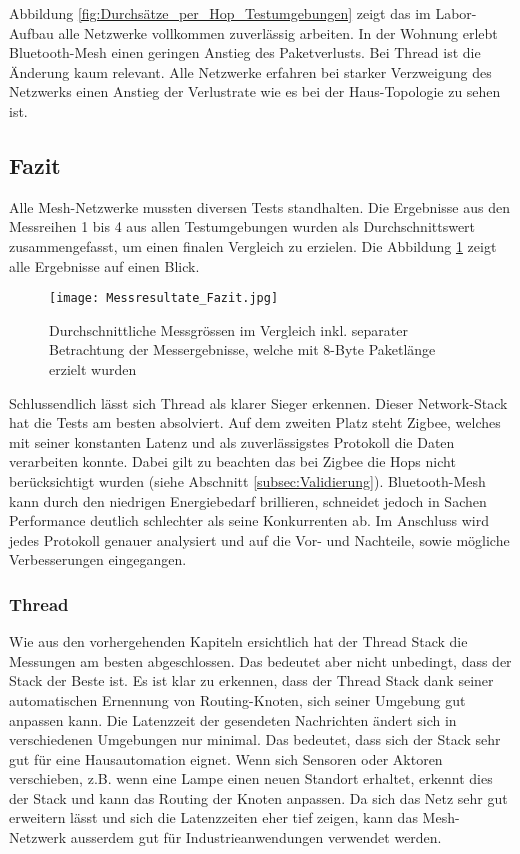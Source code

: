 Abbildung \ref{fig:Durchsätze_per_Hop_Testumgebungen} zeigt das im Labor-Aufbau alle Netzwerke vollkommen zuverlässig arbeiten. In der Wohnung erlebt Bluetooth-Mesh einen geringen Anstieg des Paketverlusts. Bei Thread ist die Änderung kaum relevant. Alle Netzwerke erfahren bei starker Verzweigung des Netzwerks einen Anstieg der Verlustrate wie es bei der Haus-Topologie zu sehen ist. 


\subsection{Fazit}\label{subsec:FazitVergleich}
Alle Mesh-Netzwerke mussten diversen Tests standhalten. Die Ergebnisse aus den Messreihen 1 bis 4 aus allen Testumgebungen wurden als Durchschnittswert zusammengefasst, um einen finalen Vergleich zu erzielen. Die Abbildung \ref{fig:Messresultate_Fazit} zeigt alle Ergebnisse auf einen Blick.

\begin{figure}[H]
	\centering
	\texttt{[image: Messresultate\_Fazit.jpg]}
	\caption{Durchschnittliche Messgrössen im Vergleich inkl. separater Betrachtung der Messergebnisse, welche mit 8-Byte Paketlänge erzielt wurden}\label{fig:Messresultate_Fazit}
\end{figure}

Schlussendlich lässt sich Thread als klarer Sieger erkennen. Dieser Network-Stack hat die Tests am besten absolviert. Auf dem zweiten Platz steht Zigbee, welches mit seiner konstanten Latenz und als zuverlässigstes Protokoll die Daten verarbeiten konnte. Dabei gilt zu beachten das bei Zigbee die Hops nicht berücksichtigt wurden (siehe Abschnitt \ref{subsec:Validierung}). Bluetooth-Mesh kann durch den niedrigen Energiebedarf brillieren, schneidet jedoch in Sachen Performance deutlich schlechter als seine Konkurrenten ab. Im Anschluss wird jedes Protokoll genauer analysiert und auf die Vor- und Nachteile, sowie mögliche Verbesserungen eingegangen. 


\subsubsection{Thread}\label{subsubsec:FazitThread}
Wie aus den vorhergehenden Kapiteln ersichtlich hat der Thread Stack die Messungen am besten abgeschlossen. Das bedeutet aber nicht unbedingt, dass der Stack der Beste ist. Es ist klar zu erkennen, dass der Thread Stack dank seiner automatischen Ernennung von Routing-Knoten, sich seiner Umgebung gut anpassen kann. Die Latenzzeit der gesendeten Nachrichten ändert sich in verschiedenen Umgebungen nur minimal. Das bedeutet, dass sich der Stack sehr gut für eine Hausautomation eignet. Wenn sich Sensoren oder Aktoren verschieben, z.B. wenn eine Lampe einen neuen Standort erhaltet, erkennt dies der Stack und kann das Routing der Knoten anpassen. Da sich das Netz sehr gut erweitern lässt und sich die Latenzzeiten eher tief zeigen, kann das Mesh-Netzwerk ausserdem gut für Industrieanwendungen verwendet werden. 

